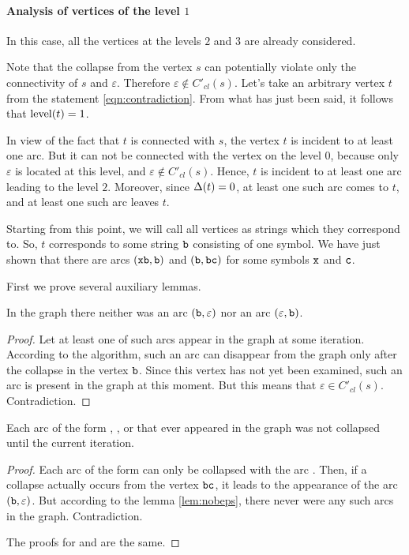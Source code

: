\paragraph{Analysis of vertices of the level \texorpdfstring{$1$}{1}}

In this case, all the vertices at the levels $ 2 $ and $ 3 $ are already considered.

Note that the collapse from the vertex $ s $ can potentially violate only the connectivity of $ s $ and $ \varepsilon $. Therefore $ \varepsilon \notin C'_{cl} (s) $. Let's take an arbitrary vertex $ t $ from the statement \ref{eqn:contradiction}. From what has just been said, it follows that $ \operatorname{level} (t) = 1 $.

In view of the fact that $ t $ is connected with $ s $, the vertex $ t $ is incident to at least one arc. But it can not be connected with the vertex on the level $ 0 $, because only $ \varepsilon $ is located at this level, and $ \varepsilon \notin C'_{cl} (s) $. Hence, $ t $ is incident to at least one arc leading to the level $ 2 $. Moreover, since $ \operatorname{\Delta} (t) = 0 $, at least one such arc comes to $ t $, and at least one such arc leaves $ t $.

Starting from this point, we will call all vertices as strings which they correspond to. So, $ t $ corresponds to some string $ \tt b $ consisting of one symbol. We have just shown that there are arcs $ ({\tt xb}, {\tt b}) $ and $ ({\tt b}, {\tt bc}) $ for some symbols $ {\tt x} $ and $ {\tt c} $.

First we prove several auxiliary lemmas.

\begin{lemma}
\label{lem:nobeps}
In the graph there neither was an arc $ ({\tt b}, \varepsilon) $ nor an arc $ (\varepsilon, {\tt b}) $.
\end{lemma}
\begin{proof}
Let at least one of such arcs appear in the graph at some iteration. According to the algorithm, such an arc can disappear from the graph only after the collapse in the vertex $ {\tt b} $. Since this vertex has not yet been examined, such an arc is present in the graph at this moment. But this means that $ \varepsilon \in C'_{cl} (s) $. Contradiction.
\end{proof}

\begin{lemma}
\label{lem:bccsave}
Each arc of the form , , or  that ever appeared in the graph was not collapsed until the current iteration.
\end{lemma}
\begin{proof}
Each arc of the form  can only be collapsed with the arc . Then, if a collapse actually occurs from the vertex $ {\tt bc} $, it leads to the appearance of the arc $ ({\tt b}, \varepsilon) $. But according to the lemma \ref{lem:nobeps}, there never were any such arcs in the graph. Contradiction.

The proofs for  and  are the same.
\end{proof}

